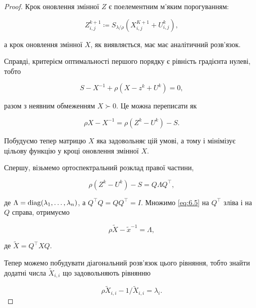 \begin{proof}
    Крок оновлення змінної $Z$ є поелементним м'яким порогуванням:

    \begin{equation}
        Z_{i,j}^{k + 1} \coloneqq S_{\lambda/\rho} \left( X_{i,j}^{K + 1} + U_{i, j}^k \right),
    \end{equation}
    
    а крок оновлення змінної $X$, як виявляється, має має аналітичний розв'язок. 
    
    Справді, критерієм  оптимальності першого порядку є рівність градієнта нулеві, тобто
    
    \begin{equation}
        S - X^{-1} + \rho \left( X - z^k + U^k \right) = 0,
    \end{equation}
    
    разом з неявним обмеженням $X \succ 0$. Це можна переписати як
    
    \begin{equation}
        \label{eq:6.5}
        \rho X - X^{-1} = \rho \left( Z^k - U^k \right) - S.
    \end{equation}
    
    Побудуємо тепер матрицю $X$ яка задовольняє цій умові, а тому і мінімізує цільову функцію у кроці оновлення змінної $X$. \medskip
    
    Спершу, візьмемо ортоспектральний розклад правої частини,
    
    \begin{equation}
        \rho \left(Z^k - U^k\right) - S = Q \Lambda Q^\intercal,
    \end{equation}
    
    де $\Lambda = \operatorname{diag} (\lambda_1, \ldots, \lambda_n)$, а $Q^\intercal Q = Q Q^\intercal = I$. Множимо \eqref{eq:6.5} на $Q^\intercal$ зліва і на $Q$ справа, отримуємо
    
    \begin{equation}
        \rho \tilde X - \tilde x^{-1} = \Lambda,
    \end{equation}
    
    де $\tilde X = Q^\intercal X Q$. \medskip
    
    Тепер можемо побудувати діагональний розв'язок цього рівняння, тобто знайти додатні числа $\tilde X_{i,i}$ що задовольняють рівнянню
    
    \begin{equation}
        \rho \tilde X_{i,i} - 1 / \tilde X_{i,i} = \lambda_i.
    \end{equation}
    

\end{proof}
